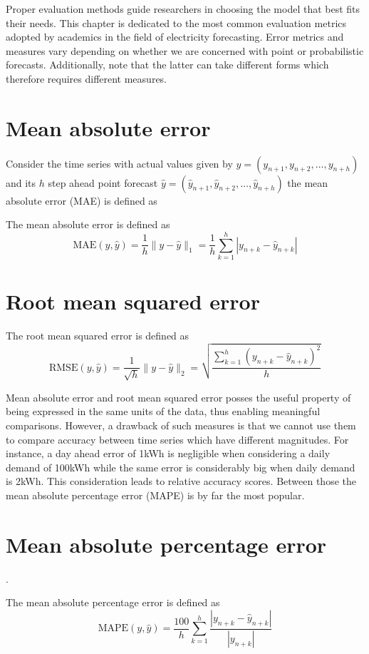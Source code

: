 Proper evaluation methods guide researchers in choosing the model that best fits their needs. This chapter is dedicated to the most common evaluation metrics adopted by academics in the field of electricity forecasting. Error metrics and measures vary depending on whether we are concerned with point or probabilistic forecasts. Additionally, note that the latter can take different forms which therefore requires different measures.
\section{Mean absolute error}\label{mae}
Consider the time series with actual values given by $y=(y_{n+1}, y_{n+2},\dots, y_{n+h})$
and its $h$ step ahead point forecast $\hat{y}=(\hat{y}_{n+1}, \hat{y}_{n+2},\dots, \hat{y}_{n+h})$ the mean absolute error (MAE) is defined as
\begin{definition}
    The mean absolute error is defined as
    $$
    \mathrm{MAE}(y,\hat{y})=\frac{1}{h}\| y- \hat{y}\|_{1}=\frac{1}{h}\sum\limits_{k=1}^{h}|y_{n+k}-\hat{y}_{n+k}|
    $$
\end{definition}

\section{Root mean squared error}\label{rmse}
\begin{definition}
    The root mean squared error is defined as
    $$
    \mathrm{RMSE}(y, \hat{y})=\frac{1}{\sqrt{h}}\|y-\hat{y}\|_{2}=\sqrt{\frac{\sum\limits_{k=1}^{h}(y_{n+k}- \hat{y}_{n+k})^2}{h}}
    $$
\end{definition}

Mean absolute error and root mean squared error posses the useful property of being expressed in the same units of the data, thus enabling meaningful comparisons.
However, a drawback of such measures is that we cannot use them to compare accuracy between time series which have different magnitudes. For instance, a day ahead error of 1kWh is negligible when considering a daily demand of 100kWh while the same error is considerably big when daily demand is 2kWh. This consideration leads to relative accuracy scores. Between those the mean absolute percentage error (MAPE) is by far the most popular.


\section{Mean absolute percentage error}\label{mape}. 
\begin{definition}
    The mean absolute percentage error is defined as
    $$
    \mathrm{MAPE}(y,\hat{y})=\frac{100}{h}\sum\limits_{k=1}^{h}\frac{|y_{n+k}-\hat{y}_{n+k}|}{|y_{n+k}|}$$
\end{definition}

